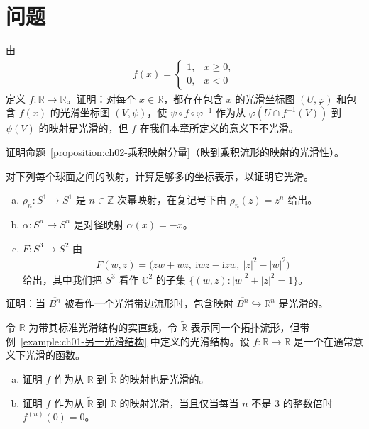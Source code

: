 \documentclass[../../main.tex]{subfiles}
\begin{document}
\section*{问题}\label{section:ch02-问题}

\begin{exercise}\label{exercise:ch02-2-1}
由
\begin{align*}
f(x)=
\begin{cases}
1, & x\geqslant 0,\\
0, & x<0
\end{cases}
\end{align*}
定义 $f:\mathbb{R}\to\mathbb{R}$。证明：对每个 $x\in\mathbb{R}$，都存在包含 $x$ 的光滑坐标图 $(U,\varphi)$ 和包含 $f(x)$ 的光滑坐标图 $(V,\psi)$，使 $\psi\circ f\circ\varphi^{-1}$ 作为从 $\varphi(U\cap f^{-1}(V))$ 到 $\psi(V)$ 的映射是光滑的，但 $f$ 在我们本章所定义的意义下不光滑。
\end{exercise}

\begin{exercise}\label{exercise:ch02-2-2}
证明命题~\cref{proposition:ch02-乘积映射分量}（映到乘积流形的映射的光滑性）。
\end{exercise}

\begin{exercise}\label{exercise:ch02-2-3}
对下列每个球面之间的映射，计算足够多的坐标表示，以证明它光滑。
\begin{enumerate}[(a)]
\item $\rho_{n}:S^{1}\to S^{1}$ 是 $n\in\mathbb{Z}$ 次幂映射，在复记号下由 $\rho_{n}(z)=z^{n}$ 给出。
\item $\alpha:S^{n}\to S^{n}$ 是对径映射 $\alpha(x)=-x$。
\item $F:S^{3}\to S^{2}$ 由
\begin{align*}
F(w,z)=\bigl(z\overline{w}+w\overline{z},\ \mathrm{i}w\overline{z}-\mathrm{i}z\overline{w},\ |z|^{2}-|w|^{2}\bigr)
\end{align*}
给出，其中我们把 $S^{3}$ 看作 $\mathbb{C}^{2}$ 的子集 $\{(w,z):|w|^{2}+|z|^{2}=1\}$。
\end{enumerate}
\end{exercise}

\begin{exercise}\label{exercise:ch02-2-4}
证明：当 $\overline{B^{n}}$ 被看作一个光滑带边流形时，包含映射 $\overline{B^{n}}\hookrightarrow\mathbb{R}^{n}$ 是光滑的。
\end{exercise}

\begin{exercise}\label{exercise:ch02-2-5}
令 $\mathbb{R}$ 为带其标准光滑结构的实直线，令 $\widetilde{\mathbb{R}}$ 表示同一个拓扑流形，但带例~\cref{example:ch01-另一光滑结构} 中定义的光滑结构。设 $f:\mathbb{R}\to\mathbb{R}$ 是一个在通常意义下光滑的函数。
\begin{enumerate}[(a)]
\item 证明 $f$ 作为从 $\mathbb{R}$ 到 $\widetilde{\mathbb{R}}$ 的映射也是光滑的。
\item 证明 $f$ 作为从 $\widetilde{\mathbb{R}}$ 到 $\mathbb{R}$ 的映射光滑，当且仅当每当 $n$ 不是 $3$ 的整数倍时 $f^{(n)}(0)=0$。
\end{enumerate}
\end{exercise}
\end{document}
